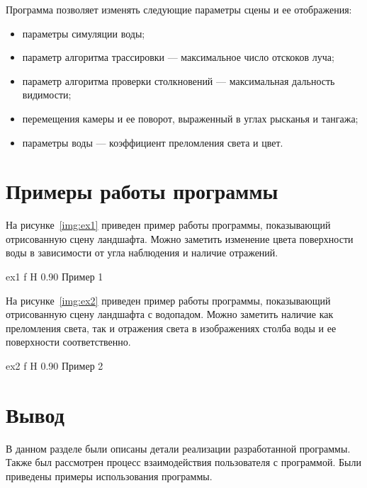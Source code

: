 Программа позволяет изменять следующие параметры сцены и ее отображения:
\begin{itemize}
    \item параметры симуляции воды;
    \item параметр алгоритма трассировки --- максимальное число отскоков луча;
    \item параметр алгоритма проверки столкновений --- максимальная дальность видимости;
    \item перемещения камеры и ее поворот, выраженный в углах рысканья и тангажа;
    \item параметры воды --- коэффициент преломления света и цвет.
\end{itemize}

\section{Примеры работы программы}

На рисунке~\ref{img:ex1} приведен пример работы программы, показывающий отрисованную 
сцену ландшафта. Можно заметить изменение цвета поверхности воды в зависимости
от угла наблюдения и наличие отражений.

    {ex1}
    {f}
    {H}
    {0.90\textwidth}
    {Пример 1}

На рисунке~\ref{img:ex2} приведен пример работы программы, показывающий отрисованную сцену ландшафта
с водопадом. Можно заметить наличие как преломления света, так и отражения света 
в изображениях столба воды и ее поверхности соответственно.

    {ex2}
    {f}
    {H}
    {0.90\textwidth}
    {Пример 2}

\section*{Вывод}

В данном разделе были описаны детали реализации разработанной программы. 
Также был рассмотрен процесс взаимодействия пользователя с программой.
Были приведены примеры использования программы.
